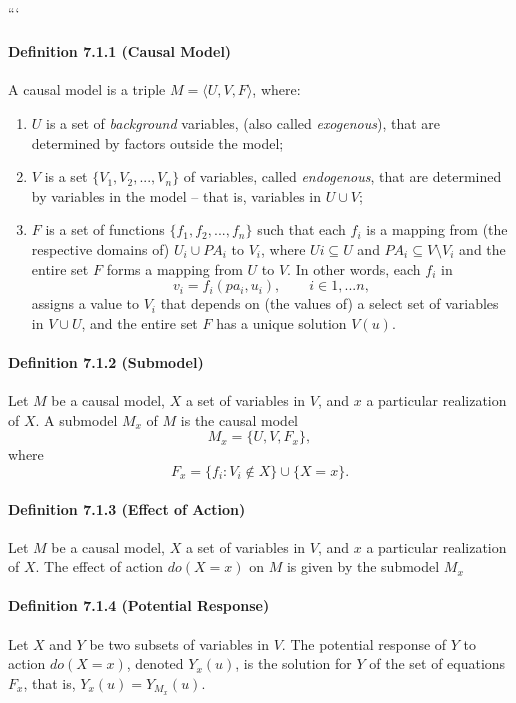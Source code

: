 ```
\paragraph{Definition 7.1.1 (Causal Model)}
A causal model is a triple
$M = \langle U, V, F\rangle$,
where:
\begin{enumerate}[label=(\roman*)]
    \item $U$ is a set of \emph{background} variables, (also called \emph{exogenous}), that are determined by factors outside the model;
    \item $V$ is a set $\{V_1 , V_2 ,..., V_n\}$ of variables, called \emph{endogenous}, that are determined by variables in the model -- that is, variables in $U\cup V$;
    \item $F$ is a set of functions $\{f_1 , f_2 ,..., f_n\}$ such that each $f_i$ is a mapping from (the respective domains of) $U_i \cup PA_i$ to $V_i$, where $U i \subseteq U$ and $PA_i \subseteq V \setminus V_i$ and the entire set $F$ forms a mapping from $U$ to $V$. In other words, each $f_i$ in $$v_i = f_i (pa_i , u_i ),\qquad  i\in 1, ... n,$$ assigns a value to $V_i$ that depends on (the values of) a select set of variables in $V \cup U$, and the entire set $F$ has a unique solution $V(u)$.
\end{enumerate}

\paragraph{Definition 7.1.2 (Submodel)}
Let $M$ be a causal model, $X$ a set of variables in $V$, and $x$ a particular realization of $X$. A submodel $M_x$ of $M$ is the causal model $$M_x =\{U, V, F_x\},$$ where $$F_x = \{ f_i : V_i \notin X\}\cup\{ X = x\}.$$

\paragraph{Definition 7.1.3 (Effect of Action)}
Let $M$ be a causal model, $X$ a set of variables in $V$, and $x$ a particular realization of $X$. The effect of action $do(X=x)$ on $M$ is given by the submodel $M_x$

\paragraph{Definition 7.1.4 (Potential Response)}
Let $X$ and $Y$ be two subsets of variables in $V$. The potential response of $Y$ to action $do(X = x)$, denoted $Y_x(u)$, is the solution for $Y$ of the set of equations $F_x$, that is, $Y_x(u) = Y_{M_x}(u)$.

